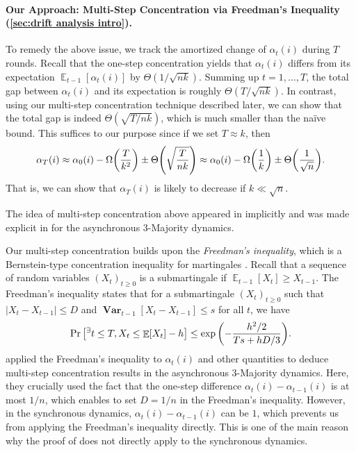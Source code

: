 \documentclass[letterpaper,11pt]{article}
\DeclareMathOperator*{\E}{\mathbb{E}}
\DeclareMathOperator*{\Var}{\mathbf{Var}}
\newcommand{\tinyexists}{{}^{\exists}}
\begin{document}
\paragraph*{Our Approach: Multi-Step Concentration via Freedman's Inequality (\cref{sec:drift analysis intro}).}
To remedy the above issue, we track the amortized change of $\alpha_t(i)$ during $T$ rounds.
Recall that the one-step concentration yields that $\alpha_t(i)$ differs from its expectation $\E_{t-1}[\alpha_t(i)]$ by $\Theta(1/\sqrt{nk})$.
Summing up $t=1,\dots,T$, the total gap between $\alpha_t(i)$ and its expectation is roughly $\Theta(T/\sqrt{nk})$.
In contrast, using our multi-step concentration technique described later, we can show that the total gap is indeed $\Theta(\sqrt{T/nk})$, which is much smaller than the na\"ive bound.
This suffices to our purpose since if we set $T\approx k$, then
\begin{align*}
  \alpha_T(i) \approx \alpha_0(i) - \Omega\qty(\frac{T}{k^2}) \pm \Theta\qty(\sqrt{\frac{T}{nk}}) \approx \alpha_0(i) - \Omega\qty(\frac{1}{k}) \pm \Theta\qty(\frac{1}{\sqrt{n}}).
\end{align*}
That is, we can show that $\alpha_T(i)$ is likely to decrease if $k\ll \sqrt{n}$.

The idea of multi-step concentration above appeared in \cite{nearly_tight_analysis} implicitly and was made explicit in \cite{async_3-majority_soda25} for the asynchronous 3-Majority dynamics.

Our multi-step concentration builds upon the \emph{Freedman's inequality}, which is a Bernstein-type concentration inequality for martingales \cite[Theorem 4.1]{Fre75}.
Recall that a sequence of random variables $(X_t)_{t\ge 0}$ is a submartingale if $\E_{t-1}[X_t] \ge X_{t-1}$.
The Freedman's inequality states that for a submartingale $(X_t)_{t\ge 0}$ such that $|X_t - X_{t-1}| \le D$ and $\Var_{t-1}[X_t - X_{t-1}] \le s$ for all $t$, we have 
\begin{align}
  \Pr\qty[\tinyexists t\le T,X_t \le \E[X_t] - h] \le \exp\qty(-\frac{h^2/2}{Ts + hD/3}). \label{eq:Freedman_ineq_intro}
\end{align}
\citet{async_3-majority_soda25} applied the Freedman's inequality to $\alpha_t(i)$ and other quantities to deduce multi-step concentration results in the asynchronous 3-Majority dynamics.
Here, they crucially used the fact that the one-step difference $\alpha_t(i) - \alpha_{t-1}(i)$ is at most $1/n$, which enables to set $D=1/n$ in the Freedman's inequality.
However, in the synchronous dynamics, $\alpha_t(i) - \alpha_{t-1}(i)$ can be $1$, which prevents us from applying the Freedman's inequality directly.
This is one of the main reason why the proof of \cite{async_3-majority_soda25} does not directly apply to the synchronous dynamics.
\end{document}
